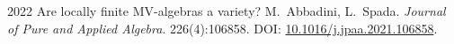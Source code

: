 \pubrow
  {2022}
  {Are locally finite MV-algebras a variety?}
  {M.\ Abbadini, L.\ Spada.}
  {\emph{Journal of Pure and Applied Algebra}. 226(4):106858. DOI: \href{https://doi.org/10.1016/j.jpaa.2021.106858}{10.1016/j.jpaa.2021.106858}.}

